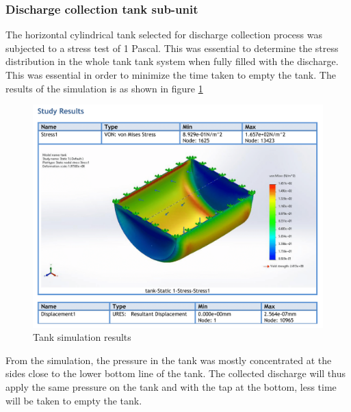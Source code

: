 \subsubsection{Discharge collection tank sub-unit}
The horizontal cylindrical tank selected for discharge collection process was subjected to a stress test of 1 Pascal. This was essential to determine the stress distribution in the whole tank tank system when fully filled with the discharge. This was essential in order to minimize the time taken to empty the tank. The results of the simulation is as shown in figure \ref{fig:tank_simulation_results}
  \begin{figure}[H]
         \centering
         \includegraphics[width=\textwidth, height=.4\textheight]{Figures/tank-Static-1-1-1.png}
         \caption{Tank simulation results}
         \label{fig:tank_simulation_results}
     \end{figure}
\par
From the simulation, the pressure in the tank was mostly concentrated at the sides close to the lower bottom line of the tank. The collected discharge will thus apply the same pressure on the tank and with the tap at the bottom, less time will be taken to empty the tank.
